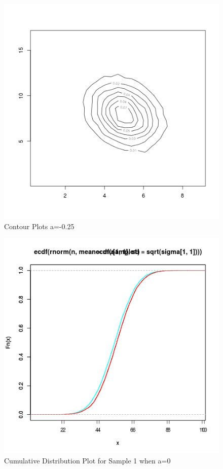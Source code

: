 \documentclass{article}
\begin{document}
  			\begin{figure}
  			\includegraphics[width=\linewidth]{pic/contour_plot_1.png}
 			 \caption{Contour Plots a=-0.25}
  			\label{fig:hist1_1}
  			\end{figure}
  			
  			\begin{figure}[!ht]
  			\includegraphics[width=\linewidth]{pic/cdf_sample1_2.png}
 			 \caption{Cumulative Distribution Plot for Sample 1 when a=0}
  			\label{fig:hist1_1}
  			\end{figure}
  			
\end{document}
